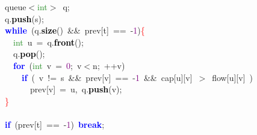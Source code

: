 {{\mbox{}\ \ \ \ queue\textcolor{BrickRed}{$<$}\textcolor{ForestGreen}{int}\textcolor{BrickRed}{$>$}\ q\textcolor{BrickRed}{;} \\
\mbox{}\ \ \ \ q\textcolor{BrickRed}{.}\textbf{\textcolor{Black}{push}}\textcolor{BrickRed}{(}s\textcolor{BrickRed}{);} \\
\mbox{}\ \ \ \ \textbf{\textcolor{Blue}{while}}\ \textcolor{BrickRed}{(}q\textcolor{BrickRed}{.}\textbf{\textcolor{Black}{size}}\textcolor{BrickRed}{()}\ \textcolor{BrickRed}{\&\&}\ prev\textcolor{BrickRed}{[}t\textcolor{BrickRed}{]}\ \textcolor{BrickRed}{==}\ \textcolor{BrickRed}{-}\textcolor{Purple}{1}\textcolor{BrickRed}{)}\textcolor{Red}{\{} \\
\mbox{}\ \ \ \ \ \ \textcolor{ForestGreen}{int}\ u\ \textcolor{BrickRed}{=}\ q\textcolor{BrickRed}{.}\textbf{\textcolor{Black}{front}}\textcolor{BrickRed}{();} \\
\mbox{}\ \ \ \ \ \ q\textcolor{BrickRed}{.}\textbf{\textcolor{Black}{pop}}\textcolor{BrickRed}{();} \\
\mbox{}\ \ \ \ \ \ \textbf{\textcolor{Blue}{for}}\ \textcolor{BrickRed}{(}\textcolor{ForestGreen}{int}\ v\ \textcolor{BrickRed}{=}\ \textcolor{Purple}{0}\textcolor{BrickRed}{;}\ v\textcolor{BrickRed}{$<$}n\textcolor{BrickRed}{;}\ \textcolor{BrickRed}{++}v\textcolor{BrickRed}{)} \\
\mbox{}\ \ \ \ \ \ \ \ \textbf{\textcolor{Blue}{if}}\ \textcolor{BrickRed}{(}\ v\ \textcolor{BrickRed}{!=}\ s\ \textcolor{BrickRed}{\&\&}\ prev\textcolor{BrickRed}{[}v\textcolor{BrickRed}{]}\ \textcolor{BrickRed}{==}\ \textcolor{BrickRed}{-}\textcolor{Purple}{1}\ \textcolor{BrickRed}{\&\&}\ cap\textcolor{BrickRed}{[}u\textcolor{BrickRed}{][}v\textcolor{BrickRed}{]}\ \textcolor{BrickRed}{$>$}\ flow\textcolor{BrickRed}{[}u\textcolor{BrickRed}{][}v\textcolor{BrickRed}{]}\ \textcolor{BrickRed}{)} \\
\mbox{}\ \ \ \ \ \ \ \ \ \ prev\textcolor{BrickRed}{[}v\textcolor{BrickRed}{]}\ \textcolor{BrickRed}{=}\ u\textcolor{BrickRed}{,}\ q\textcolor{BrickRed}{.}\textbf{\textcolor{Black}{push}}\textcolor{BrickRed}{(}v\textcolor{BrickRed}{);} \\
\mbox{}\ \ \ \ \textcolor{Red}{\}} \\
\mbox{} \\
\mbox{}\ \ \ \ \textbf{\textcolor{Blue}{if}}\ \textcolor{BrickRed}{(}prev\textcolor{BrickRed}{[}t\textcolor{BrickRed}{]}\ \textcolor{BrickRed}{==}\ \textcolor{BrickRed}{-}\textcolor{Purple}{1}\textcolor{BrickRed}{)}\ \textbf{\textcolor{Blue}{break}}\textcolor{BrickRed}{;} \\
}}
